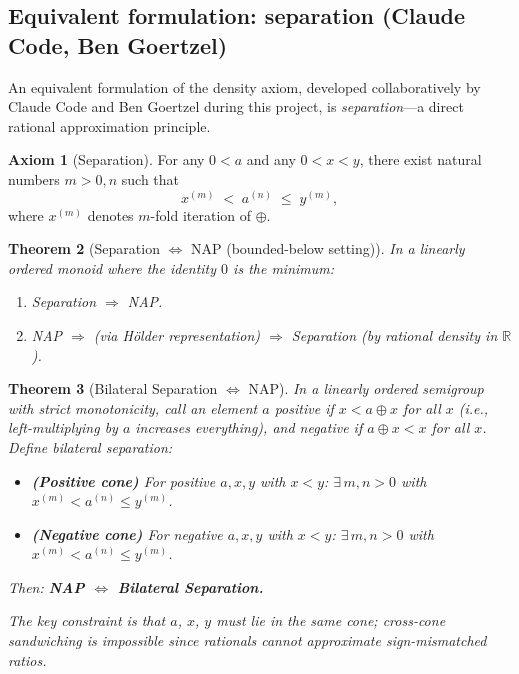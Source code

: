\documentclass[11pt]{article}
\newtheorem{theorem}{Theorem}[section]
\theoremstyle{definition}
\newtheorem{axiom}[theorem]{Axiom}
\theoremstyle{remark}
\begin{document}
\subsection{Equivalent formulation: separation (Claude Code, Ben Goertzel)}

An equivalent formulation of the density axiom, developed collaboratively by Claude Code and Ben Goertzel
during this project, is \emph{separation}---a direct rational approximation principle.

\begin{axiom}[Separation]
For any $0<a$ and any $0<x<y$, there exist natural numbers $m>0,n$ such that
\[
x^{(m)} \;<\; a^{(n)} \;\le\; y^{(m)},
\]
where $x^{(m)}$ denotes $m$-fold iteration of $\oplus$.
\end{axiom}

\begin{theorem}[Separation $\Leftrightarrow$ NAP (bounded-below setting)]
\label{thm:sep-nap-prob}
In a linearly ordered monoid where the identity $0$ is the minimum:
\begin{enumerate}
\item Separation $\Rightarrow$ NAP.
\item NAP $\Rightarrow$ (via H\"older representation) $\Rightarrow$ Separation (by rational density in $\mathbb{R}$).
\end{enumerate}
\end{theorem}

\begin{theorem}[Bilateral Separation $\Leftrightarrow$ NAP]
\label{thm:sep-nap-general}
In a linearly ordered semigroup with strict monotonicity, call an element $a$ \emph{positive}
if $x < a \oplus x$ for all $x$ (i.e., left-multiplying by $a$ increases everything), and
\emph{negative} if $a \oplus x < x$ for all $x$. Define \emph{bilateral separation}:
\begin{itemize}
\item \textbf{(Positive cone)} For positive $a, x, y$ with $x < y$: $\exists\, m, n > 0$ with $x^{(m)} < a^{(n)} \le y^{(m)}$.
\item \textbf{(Negative cone)} For negative $a, x, y$ with $x < y$: $\exists\, m, n > 0$ with $x^{(m)} < a^{(n)} \le y^{(m)}$.
\end{itemize}
Then: \textbf{NAP $\Leftrightarrow$ Bilateral Separation.}

The key constraint is that $a$, $x$, $y$ must lie in the \emph{same cone};
cross-cone sandwiching is impossible since rationals cannot approximate sign-mismatched ratios.
\end{theorem}
\end{document}
